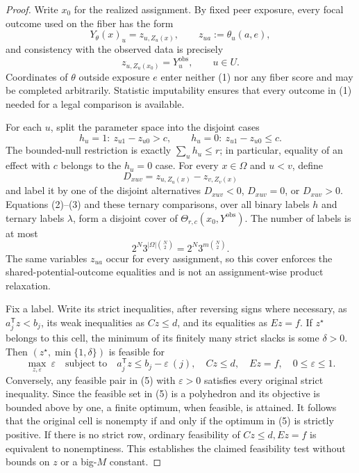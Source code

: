 \documentclass{article}
\begin{document}
\begin{proof}
Write \(x_0\) for the realized assignment.  By fixed peer exposure, every focal outcome used on the fiber has the form
\[
 Y_\theta(x)_u=z_{u,Z_u(x)},
 \qquad z_{ua}:=\theta_u(a,e),
\tag{1}
\]
and consistency with the observed data is precisely
\[
 z_{u,Z_u(x_0)}=Y^{\mathrm{obs}}_u,
 \qquad u\in U.
\tag{2}
\]
Coordinates of \(\theta\) outside exposure \(e\) enter neither (1) nor any fiber score and may be completed arbitrarily.  Statistic imputability ensures that every outcome in (1) needed for a legal comparison is available.

For each \(u\), split the parameter space into the disjoint cases
\[
 h_u=1:\ z_{u1}-z_{u0}>c,
 \qquad
 h_u=0:\ z_{u1}-z_{u0}\leq c.
\tag{3}
\]
The bounded-null restriction is exactly \(\sum_u h_u\leq r\); in particular, equality of an effect with \(c\) belongs to the \(h_u=0\) case.  For every \(x\in\Omega\) and \(u<v\), define
\[
 D_{xuv}=z_{u,Z_u(x)}-z_{v,Z_v(x)}
\]
and label it by one of the disjoint alternatives \(D_{xuv}<0\), \(D_{xuv}=0\), or \(D_{xuv}>0\).  Equations (2)--(3) and these ternary comparisons, over all binary labels \(h\) and ternary labels \(\lambda\), form a disjoint cover of \(\Theta_{r,c}(x_0,Y^{\mathrm{obs}})\).  The number of labels is at most
\[
 2^N3^{|\Omega|\binom N2}=2^N3^{m\binom N2}.
\tag{4}
\]
The same variables \(z_{ua}\) occur for every assignment, so this cover enforces the shared-potential-outcome equalities and is not an assignment-wise product relaxation.

Fix a label.  Write its strict inequalities, after reversing signs where necessary, as \(a_j^{\mathsf T}z<b_j\), its weak inequalities as \(Cz\leq d\), and its equalities as \(Ez=f\).  If \(z^\star\) belongs to this cell, the minimum of its finitely many strict slacks is some \(\delta>0\).  Then \((z^\star,\min\{1,\delta\})\) is feasible for
\[
 \max_{z,\varepsilon}\ \varepsilon
 \quad\text{subject to}\quad
 a_j^{\mathsf T}z\leq b_j-\varepsilon\ (j),\quad
 Cz\leq d,\quad Ez=f,\quad0\leq\varepsilon\leq1.
\tag{5}
\]
Conversely, any feasible pair in (5) with \(\varepsilon>0\) satisfies every original strict inequality.  Since the feasible set in (5) is a polyhedron and its objective is bounded above by one, a finite optimum, when feasible, is attained.  It follows that the original cell is nonempty if and only if the optimum in (5) is strictly positive.  If there is no strict row, ordinary feasibility of \(Cz\leq d,Ez=f\) is equivalent to nonemptiness.  This establishes the claimed feasibility test without bounds on \(z\) or a big-\(M\) constant.


\end{proof}
\end{document}
